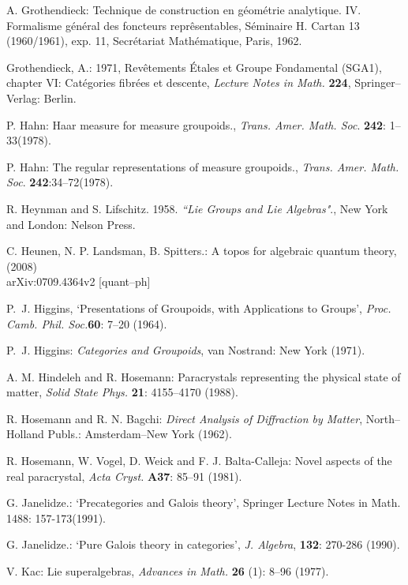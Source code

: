 \documentclass[12pt]{article}
\theoremstyle{plain}
\theoremstyle{definition}
\numberwithin{equation}{section}
\newcommand{\<}{{\langle}}
\begin{document}
\begin{thebibliography}{99}
A. Grothendieck: Technique de construction en g\'eom\'etrie analytique. 
IV. Formalisme g\'en\'eral des foncteurs repr\^esentables, 
S\'eminaire H. Cartan 13 (1960/1961), exp. 11, Secr\'etariat Math\'ematique, Paris, 1962.


Grothendieck, A.: 1971, Rev\^{e}tements \'Etales et Groupe Fondamental (SGA1),
chapter VI: Cat\'egories fibr\'ees et descente, \emph{Lecture Notes in Math.}
\textbf{224}, Springer--Verlag: Berlin.


P. Hahn: Haar measure for measure groupoids., \textit{Trans. Amer. Math. Soc}. \textbf{242}: 1--33(1978).

P. Hahn: The regular representations of measure groupoids., \textit{Trans. Amer. Math. Soc}. \textbf{242}:34--72(1978).

R. Heynman and S. Lifschitz. 1958. \emph{``Lie Groups and Lie Algebras"}., New York and %
London: Nelson Press.

C. Heunen, N. P. Landsman, B. Spitters.: A topos for algebraic quantum theory, (2008)   \\arXiv:0709.4364v2 [quant--ph]

P.~J. {H}iggins, `Presentations of Groupoids, with Applications to Groups', %
{\em Proc. {C}amb. Phil. Soc.}\textbf{60}: 7--20 (1964).

P.~J. {H}iggins: {\em Categories and Groupoids\/}, {v}an Nostrand: New York (1971).

A. M. Hindeleh and R. Hosemann: Paracrystals representing the physical state of matter, \emph{Solid State Phys.} \textbf{21}: 4155--4170 (1988).

R. Hosemann and R. N. Bagchi: \emph{Direct Analysis of Diffraction
by Matter}, North--Holland Publs.: Amsterdam--New York (1962).

R. Hosemann, W. Vogel, D. Weick and F. J. Balta-Calleja: Novel
aspects of the real paracrystal, \emph{Acta Cryst.} \textbf{A37}: 85--91 (1981).

G. Janelidze.: `Precategories and Galois theory', Springer Lecture Notes in Math. 1488:  157-173(1991).

G. Janelidze.: `Pure Galois theory in categories', \textit{J. Algebra}, \textbf{132}: 270-286 (1990).

V. Kac: Lie superalgebras, \emph{Advances in Math.} \textbf{26} (1): 8--96 (1977).


\end{thebibliography}
\end{document}
